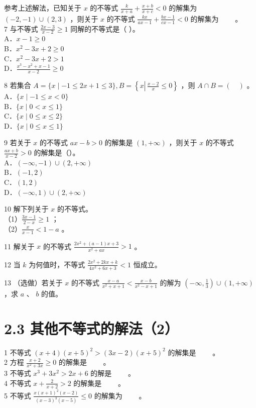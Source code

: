 \documentclass[10pt]{article}
\begin{document}
参考上述解法，已知关于 \(x\) 的不等式 \(\frac{k}{x+a}+\frac{x+b}{x+c}<0\) 的解集为 \((-2,-1) \cup(2,3)\) ，则关于 \(x\) 的不等式 \(\frac{k x}{a x-1}+\frac{b x-1}{c x-1}<0\) 的解集为 \(\qquad\)。\\
7 与不等式 \(\frac{2 x-3}{x-2} \geqslant 1\) 同解的不等式是（ ）。\\
A．\(x-1 \geqslant 0\)\\
B．\(x^{2}-3 x+2 \geqslant 0\)\\
C．\(x^{2}-3 x+2>1\)\\
D．\(\frac{x^{3}-x^{2}+x-1}{x-2} \geqslant 0\)

8 若集合 \(A=\{x \mid-1 \leqslant 2 x+1 \leqslant 3\}, B=\left\{x \left\lvert\, \frac{x-2}{x} \leqslant 0\right.\right\}\) ，则 \(A \cap B=(\quad)\) 。\\
A．\(\{x \mid-1 \leqslant x<0\}\)\\
B．\(\{x \mid 0<x \leqslant 1\}\)\\
C．\(\{x \mid 0 \leqslant x \leqslant 2\}\)\\
D．\(\{x \mid 0 \leqslant x \leqslant 1\}\)

9 若关于 \(x\) 的不等式 \(a x-b>0\) 的解集是 \((1,+\infty)\) ，则关于 \(x\) 的不等式 \(\frac{a x+b}{x-2}>0\) 的解集是（）。\\
A．\((-\infty,-1) \cup(2,+\infty)\)\\
B．\((-1,2)\)\\
C．\((1,2)\)\\
D．\((-\infty, 1) \cup(2,+\infty)\)

10 解下列关于 \(x\) 的不等式。\\
（1）\(\frac{3 x-1}{2-x} \geqslant 1\) ；\\
（2）\(\frac{x}{x-1}<1-a\) 。

11 解关于 \(x\) 的不等式 \(\frac{2 x^{2}+(a-1) x+3}{x^{2}+a x}>1\) 。

12 当 \(k\) 为何值时，不等式 \(\frac{2 x^{2}+2 k x+k}{4 x^{2}+6 x+3}<1\) 恒成立。

13 （选做）若关于 \(x\) 的不等式 \(\frac{x-a}{x^{2}+x+1}<\frac{x-b}{x^{2}-x+1}\) 的解为 \(\left(-\infty, \frac{1}{3}\right) \cup(1,+\infty)\) ，求 \(a\) 、 \(b\) 的值。

\section*{2.3 其他不等式的解法（2）}
1 不等式 \((x+4)(x+5)^{2}>(3 x-2)(x+5)^{2}\) 的解集是 \(\qquad\)。\\
2 方程 \(\frac{x+2}{x^{2}+3 x} \geqslant 0\) 的解集是 \(\qquad\)。\\
3 不等式 \(x^{3}+3 x^{2}>2 x+6\) 的解是 \(\qquad\)。\\
4 不等式 \(x+\frac{2}{x+2}>2\) 的解集是 \(\qquad\)。\\
5 不等式 \(\frac{x(x+1)^{2}(x-2)}{(x-3)^{3}(x-5)} \leqslant 0\) 的解集为 \(\qquad\)。
\end{document}
